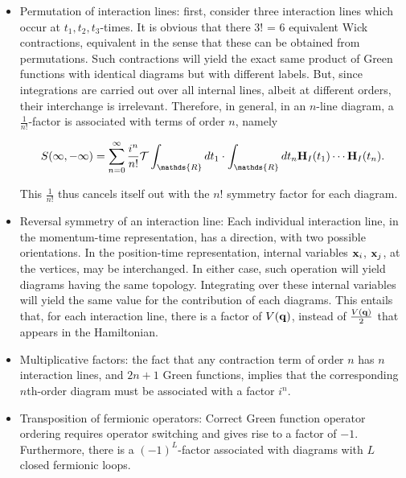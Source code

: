 \begin{itemize}
    \item Permutation of interaction lines: first, consider three interaction lines which occur at $t_1, t_2, t_3$-times. It is obvious that there 3! = 6 equivalent Wick contractions, equivalent in the sense that these can be obtained from permutations. Such contractions will yield the exact same product of Green functions with identical diagrams but with different labels. But, since integrations are carried out over all internal lines, albeit at different orders, their interchange is irrelevant. Therefore, in general, in an $n$-line diagram, a $\frac{1}{n!}$-factor is associated with terms of order $n$, namely 

    $$
        S(\infty, -\infty) = \sum_{n=0}^{\infty} \frac{i^n}{n!} \mathcal{T} \int_{\mathds{R}} 
        dt_1 \cdot \int_{\mathds{R}} dt_n {\bf H}_I(t_1) \cdots {\bf H}_I(t_n).
    $$

    This $\frac{1}{n!}$ thus cancels itself out with the $n!$ symmetry factor for each diagram. \\

    \item Reversal symmetry of an interaction line: Each individual interaction line, in the momentum-time representation, has a direction, with two possible orientations. In the position-time representation, internal variables ${\bf x}_i$, ${\bf x}_j$, at the vertices, may be interchanged. In either case, such operation will yield diagrams having the same topology. Integrating over these internal variables will yield the same value for the contribution of each diagrams. This entails that, for each interaction line, there is a factor of $V({\bf q})$, instead of $\frac{V({\bf q})}{2}$ that appears in the Hamiltonian. \\

    \item Multiplicative factors: the fact that any contraction term of order $n$ has $n$ interaction lines, and $2n+1$ Green functions, implies that the corresponding $n$th-order diagram must be associated with a factor $i^n$. \\

    \item Transposition of fermionic operators: Correct Green function operator ordering requires operator switching and gives rise to a factor of $-1$. 
    Furthermore, there is a $(-1)^L$-factor associated with diagrams with $L$ closed fermionic loops. 
    
\end{itemize}

